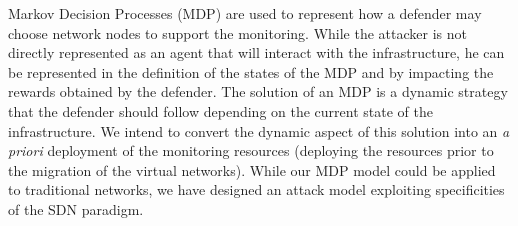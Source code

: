 Markov Decision Processes (MDP) are used to represent how a defender may choose network nodes to support the monitoring.
While the attacker is not directly represented as an agent that will interact with the infrastructure, he can be represented in the definition of the states of the MDP and by impacting the rewards obtained by the defender.
The solution of an MDP is a dynamic strategy that the defender should follow depending on the current state of the infrastructure.
We intend to convert the dynamic aspect of this solution into an \textit{a priori} deployment of the monitoring resources (\ie deploying the resources prior to the migration of the virtual networks).
While our MDP model could be applied to traditional networks, we have designed an attack model exploiting specificities of the SDN paradigm.